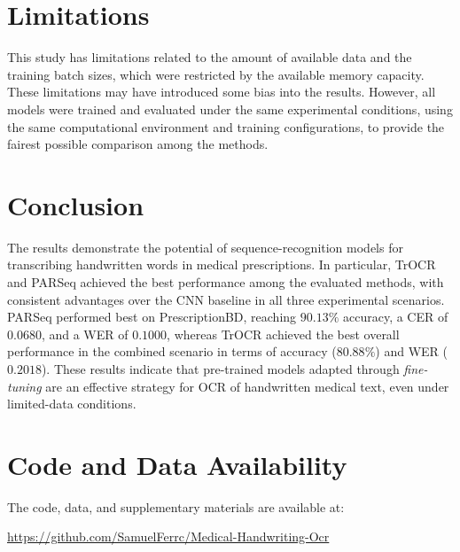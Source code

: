 \documentclass[11pt,a4paper]{article}
\begin{document}
\section{Limitations}
\label{sec:limitations}

This study has limitations related to the amount of available data and the training batch sizes, which were restricted by the available memory capacity. These limitations may have introduced some bias into the results. However, all models were trained and evaluated under the same experimental conditions, using the same computational environment and training configurations, to provide the fairest possible comparison among the methods.


\section{Conclusion}
\label{sec:conclusion}

The results demonstrate the potential of sequence-recognition models for transcribing handwritten words in medical prescriptions. In particular, TrOCR and PARSeq achieved the best performance among the evaluated methods, with consistent advantages over the CNN baseline in all three experimental scenarios. PARSeq performed best on PrescriptionBD, reaching $90.13\%$ accuracy, a CER of $0.0680$, and a WER of $0.1000$, whereas TrOCR achieved the best overall performance in the combined scenario in terms of accuracy ($80.88\%$) and WER ($0.2018$). These results indicate that pre-trained models adapted through \textit{fine-tuning} are an effective strategy for OCR of handwritten medical text, even under limited-data conditions.

\section*{Code and Data Availability}

The code, data, and supplementary materials are available at:
\begin{center}
	\url{https://github.com/SamuelFerrc/Medical-Handwriting-Ocr}
\end{center}



\end{document}
